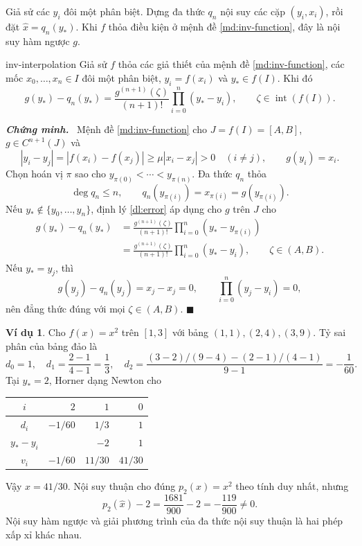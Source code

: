 \documentclass[12pt,a4paper,oneside]{book}
\numberwithin{algorithm}{chapter}
\theoremstyle{definition}
\newtheorem{vidu}{Ví dụ}[chapter]
\newenvironment{chungminh}{\par\medskip\noindent\textbf{\textit{\color{mainblue}Chứng minh.}}\ }{\hfill$\blacksquare$\par\medskip}
\begin{document}
Giả sử các $y_i$ đôi một phân biệt. Dựng đa thức $q_n$ nội suy các cặp $(y_i,x_i)$, rồi đặt $\widehat x=q_n(y_\ast)$. Khi $f$ thỏa điều kiện ở mệnh đề \ref{md:inv-function}, đây là nội suy hàm ngược $g$.
\begin{dinhly}{}{inv-interpolation}
Giả sử $f$ thỏa các giả thiết của mệnh đề \ref{md:inv-function}, các mốc $x_0,\ldots,x_n\in I$ đôi một phân biệt, $y_i=f(x_i)$ và $y_\ast\in f(I)$. Khi đó
\begin{equation}\label{eq:inv-interpolation-error}
 g(y_\ast)-q_n(y_\ast)
 =\frac{g^{(n+1)}(\zeta)}{(n+1)!}\prod_{i=0}^{n}(y_\ast-y_i),
 \qquad\zeta\in\operatorname{int}(f(I)).
\end{equation}
\end{dinhly}
\begin{chungminh}
Mệnh đề \ref{md:inv-function} cho $J=f(I)=[A,B]$, $g\in C^{n+1}(J)$ và
\[
 |y_i-y_j|=|f(x_i)-f(x_j)|\geq\mu|x_i-x_j|>0
 \quad(i\ne j),\qquad g(y_i)=x_i.
\]
Chọn hoán vị $\pi$ sao cho $y_{\pi(0)}<\cdots<y_{\pi(n)}$.
Đa thức $q_n$ thỏa
\[
 \deg q_n\leq n,\qquad q_n(y_{\pi(i)})=x_{\pi(i)}=g(y_{\pi(i)}).
\]
Nếu $y_\ast\notin\{y_0,\ldots,y_n\}$, định lý \ref{dl:error} áp dụng cho $g$ trên $J$ cho
\begin{align*}
 g(y_\ast)-q_n(y_\ast)
 &=\frac{g^{(n+1)}(\zeta)}{(n+1)!}
   \prod_{i=0}^{n}(y_\ast-y_{\pi(i)})\\
 &=\frac{g^{(n+1)}(\zeta)}{(n+1)!}
   \prod_{i=0}^{n}(y_\ast-y_i),\qquad\zeta\in(A,B).
\end{align*}
Nếu $y_\ast=y_j$, thì
\[
 g(y_j)-q_n(y_j)=x_j-x_j=0,
 \qquad\prod_{i=0}^{n}(y_j-y_i)=0,
\]
nên đẳng thức đúng với mọi $\zeta\in(A,B)$.
\end{chungminh}

\begin{vidu}
Cho $f(x)=x^2$ trên $[1,3]$ với bảng $(1,1),(2,4),(3,9)$. Tỷ sai phân của bảng đảo là
\[
 d_0=1,\quad d_1=\frac{2-1}{4-1}=\frac13,\quad
 d_2=\frac{(3-2)/(9-4)-(2-1)/(4-1)}{9-1}=-\frac1{60}.
\]
Tại $y_\ast=2$, Horner dạng Newton cho
\begin{center}
\begin{tabular}{c|rrr}\toprule
$i$&$2$&$1$&$0$\\\midrule
$d_i$&$-1/60$&$1/3$&$1$\\
$y_\ast-y_i$&&$-2$&$1$\\
$v_i$&$-1/60$&$11/30$&$41/30$\\\bottomrule
\end{tabular}
\end{center}
Vậy $\widehat x=41/30$. Nội suy thuận cho đúng $p_2(x)=x^2$ theo tính duy nhất, nhưng
\[
 p_2(\widehat x)-2=\frac{1681}{900}-2=-\frac{119}{900}\ne0.
\]
Nội suy hàm ngược và giải phương trình của đa thức nội suy thuận là hai phép xấp xỉ khác nhau.
\end{vidu}
\end{document}
